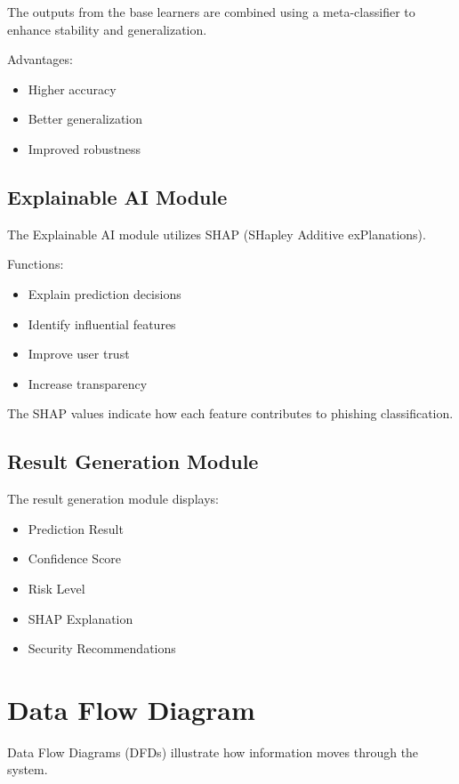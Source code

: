 \documentclass[12pt]{report}
\begin{document}
The outputs from the base learners are combined using a meta-classifier to enhance stability and generalization.

Advantages:

\begin{itemize}
    \item Higher accuracy
    \item Better generalization
    \item Improved robustness
\end{itemize}

\subsection{Explainable AI Module}

The Explainable AI module utilizes SHAP (SHapley Additive exPlanations).

Functions:

\begin{itemize}
    \item Explain prediction decisions
    \item Identify influential features
    \item Improve user trust
    \item Increase transparency
\end{itemize}

The SHAP values indicate how each feature contributes to phishing classification.

\subsection{Result Generation Module}

The result generation module displays:

\begin{itemize}
    \item Prediction Result
    \item Confidence Score
    \item Risk Level
    \item SHAP Explanation
    \item Security Recommendations
\end{itemize}

\section{Data Flow Diagram}

Data Flow Diagrams (DFDs) illustrate how information moves through the system.
\end{document}
